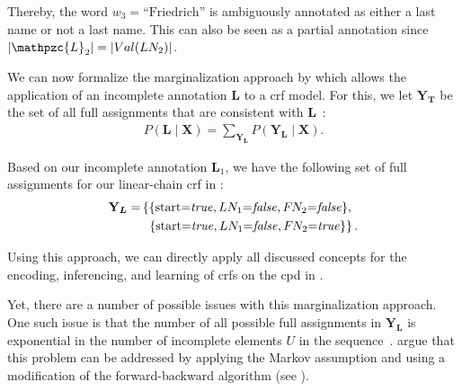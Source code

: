 Thereby, the word $w_3{=}\text{``Friedrich''}$ is ambiguously annotated as either a last name or not a last name.
This can also be seen as a \gls{partial annotation} since $|\mathpzc{L}_2|=|Val(LN_2)|$.

\bigskip

We can now formalize the marginalization approach by \citet{tsuboi2008training} which allows the application of an incomplete annotation $\bm{L}$ to a \gls{crf} model.
For this, we let $\mathbf{Y}_{\bm{T}}$ be the set of all \glspl{full assignment} that are consistent with $\bm{L}$~\citep{tsuboi2008training}:
\begin{equation}
  \label{equ:crf-marginalization}
  \begin{split}
    P\left(\bm{L}\mid\mathbf{X}\right)=\sum_{\mathbf{Y}_{\bm{L}}}P\left(\mathbf{Y}_{\bm{L}}\mid\mathbf{X}\right).
  \end{split}
\end{equation}

Based on our incomplete annotation $\bm{L}_1$, we have the following set of \glspl{full assignment} for our \gls{linear-chain crf} in :
\begin{equation*}
\begin{split}
  \mathbf{Y}_{\bm{L}}=&\left\{\{\text{start}{=}\mathit{true},LN_1{=}\mathit{false},F\hspace{-0.07em} N_2{=}\mathit{false}\},\right.\\
  &\hspace{0.15cm}\left.\{\text{start}{=}\mathit{true},LN_1{=}\mathit{false},F\hspace{-0.07em} N_2{=}\mathit{true}\}\right\}.\\
\end{split}
\end{equation*}

Using this approach, we can directly apply all discussed concepts for the encoding, inferencing, and learning of \glspl{crf} on the \gls{cpd} in .

\bigskip

Yet, there are a number of possible issues with this marginalization approach.
One such issue is that the number of all possible \glspl{full assignment} in $\mathbf{Y}_{\bm{L}}$ is exponential in the number of incomplete elements $U$ in the sequence~\citep{tsuboi2008training}.
\citet{tsuboi2008training} argue that this problem can be addressed by applying the Markov assumption and using a modification of the forward-backward algorithm (see ).

